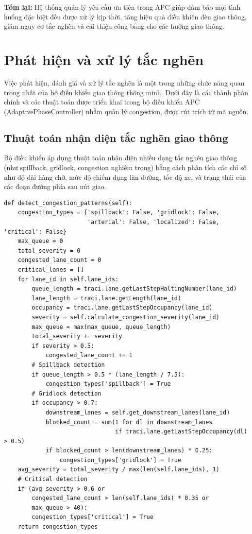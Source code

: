 \noindent\textbf{Tóm lại:} Hệ thống quản lý yêu cầu ưu tiên trong APC giúp đảm bảo mọi tình huống đặc biệt đều được xử lý kịp thời, tăng hiệu quả điều khiển đèn giao thông, giảm nguy cơ tắc nghẽn và cải thiện công bằng cho các hướng giao thông.

\section{Phát hiện và xử lý tắc nghẽn}

Việc phát hiện, đánh giá và xử lý tắc nghẽn là một trong những chức năng quan trọng nhất của bộ điều khiển giao thông thông minh. Dưới đây là các thành phần chính và các thuật toán được triển khai trong bộ điều khiển APC (AdaptivePhaseController) nhằm quản lý congestion, được rút trích từ mã nguồn.

\subsection{Thuật toán nhận diện tắc nghẽn giao thông}

Bộ điều khiển áp dụng thuật toán nhận diện nhiều dạng tắc nghẽn giao thông (như spillback, gridlock, congestion nghiêm trọng) bằng cách phân tích các chỉ số như độ dài hàng chờ, mức độ chiếm dụng làn đường, tốc độ xe, và trạng thái của các đoạn đường phía sau nút giao.
\begin{lstlisting}[style=py,caption={Hàm detect\_congestion\_patterns trong APC}]
def detect_congestion_patterns(self):
    congestion_types = {'spillback': False, 'gridlock': False,
                        'arterial': False, 'localized': False, 'critical': False}
    max_queue = 0
    total_severity = 0
    congested_lane_count = 0
    critical_lanes = []
    for lane_id in self.lane_ids:
        queue_length = traci.lane.getLastStepHaltingNumber(lane_id)
        lane_length = traci.lane.getLength(lane_id)
        occupancy = traci.lane.getLastStepOccupancy(lane_id)
        severity = self.calculate_congestion_severity(lane_id)
        max_queue = max(max_queue, queue_length)
        total_severity += severity
        if severity > 0.5:
            congested_lane_count += 1
        # Spillback detection
        if queue_length > 0.5 * (lane_length / 7.5):
            congestion_types['spillback'] = True
        # Gridlock detection
        if occupancy > 0.7:
            downstream_lanes = self.get_downstream_lanes(lane_id)
            blocked_count = sum(1 for dl in downstream_lanes
                                if traci.lane.getLastStepOccupancy(dl) > 0.5)
            if blocked_count > len(downstream_lanes) * 0.25:
                congestion_types['gridlock'] = True
    avg_severity = total_severity / max(len(self.lane_ids), 1)
    # Critical detection
    if (avg_severity > 0.6 or 
        congested_lane_count > len(self.lane_ids) * 0.35 or
        max_queue > 40):
        congestion_types['critical'] = True
    return congestion_types
\end{lstlisting}

